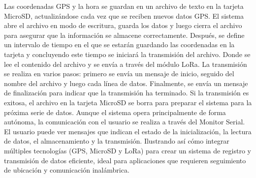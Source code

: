 \begin{itemize}
	Las coordenadas GPS y la hora se guardan en un archivo de texto en la tarjeta MicroSD, actualizándose cada vez que se reciben nuevos datos GPS. El sistema abre el archivo en modo de escritura, guarda los datos y luego cierra el archivo para asegurar que la información se almacene correctamente.
	Después, se define un intervalo de tiempo en el que se estarán guardando las coordenadas en la tarjeta y concluyendo este tiempo se iniciará la transmisión del archivo. Donde se lee el contenido del archivo y se envía a través del módulo LoRa. La transmisión se realiza en varios pasos: primero se envía un mensaje de inicio, seguido del nombre del archivo y luego cada línea de datos. Finalmente, se envía un mensaje de finalización para indicar que la transmisión ha terminado. Si la transmisión es exitosa, el archivo en la tarjeta MicroSD se borra para preparar el sistema para la próxima serie de datos.
	Aunque el sistema opera principalmente de forma autónoma, la comunicación con el
	usuario se realiza a través del Monitor Serial. El usuario puede ver mensajes que indican el estado de la inicialización, la lectura de datos, el almacenamiento y la transmisión.
	Ilustrando así cómo integrar múltiples tecnologías (GPS, MicroSD y LoRa) para crear un sistema de registro y transmisión de datos eficiente, ideal para aplicaciones que requieren seguimiento de ubicación y comunicación inalámbrica.
	

\end{itemize}
